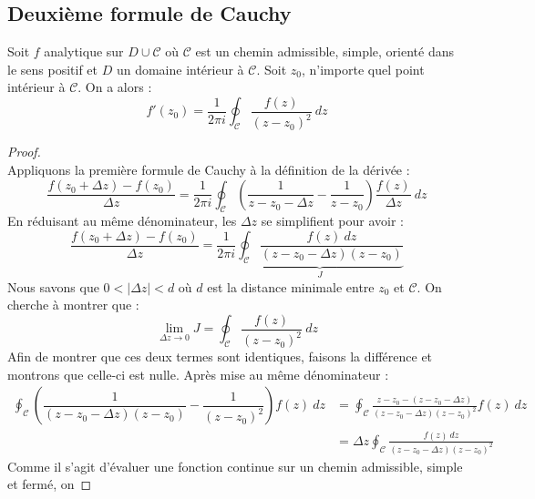     
    \subsection{Deuxième formule de Cauchy}
    Soit $f$ analytique sur $D \cup \mathcal{C}$ où $\mathcal{C}$ est un chemin admissible, simple,
    orienté dans le sens positif et $D$ un domaine intérieur à $\mathcal{C}$. Soit $z_0$, n'importe
    quel point intérieur à $\mathcal{C}$. On a alors : 
    \begin{equation}
    f'(z_0) = \dfrac{1}{2\pi i}\oint_\mathcal{C}\dfrac{f(z)}{(z-z_0)^2}\ dz
    \end{equation}
    
    \begin{proof}
	\ \\
	Appliquons la première formule de Cauchy à la définition de la dérivée :
	\begin{equation}
	\dfrac{f(z_0 +  \Delta z) - f(z_0)}{\Delta z} = \frac{1}{2\pi i}\oint_\mathcal{C}\left(
	\dfrac{1}{z-z_0 - \Delta z} - \dfrac{1}{z-z_0}\right)\dfrac{f(z)}{\Delta z}\ dz
	\end{equation}
	En réduisant au même dénominateur, les $\Delta z$ se simplifient pour avoir :
	\begin{equation}
	\dfrac{f(z_0 +  \Delta z) - f(z_0)}{\Delta z} = \frac{1}{2\pi i}\underbrace{\oint_\mathcal{C}
	\dfrac{f(z)\ dz}{(z-z_0-\Delta z)(z-z_0)}}_{J}
	\end{equation}
	Nous savons que $0<|\Delta z| < d$ où $d$ est la distance minimale entre $z_0$ et $\mathcal{C}$.
	On cherche à montrer que :
	\begin{equation}
	\lim\limits_{\Delta z \rightarrow 0} J = \oint_\mathcal{C}\frac{f(z)}{(z-z_0)^2}\ dz
	\end{equation}
	Afin de montrer que ces deux termes sont identiques, faisons la différence et montrons que 
	celle-ci est nulle. Après mise au même dénominateur :
	\begin{equation}
	\begin{array}{ll}
	\oint_\mathcal{C}\left(\dfrac{1}{(z-z_0-\Delta z)(z-z_0)} - 
	\dfrac{1}{(z-z_0)^2}\right)f(z)\ dz &= \oint_\mathcal{C} \frac{z-z_0 - (z-z_0-\Delta z)}{(z-
	z_0-\Delta z)(z-z_0)^2}f(z)\ dz\\
	 &= \Delta z\oint_\mathcal{C} \frac{f(z)\ dz}{(z-z_0-\Delta z)(z-z_0)^2}
	\end{array}
	\end{equation}
	Comme il s'agit d'évaluer une fonction continue sur un chemin admissible, simple et fermé, on

\end{proof}
